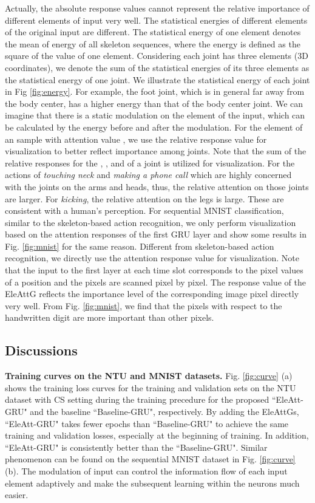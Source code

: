 \documentclass[journal]{IEEEtran}
\newcommand{\EleAttGn}{{EleAttG}}
\begin{document}
Actually, the absolute response values cannot represent the relative importance of different elements of input very well. The statistical energies of different elements of the original input are different. The statistical energy of one element denotes the mean of energy of all skeleton sequences, where the energy is defined as the square of the value of one element. Considering each joint has three elements (3D coordinates), we denote the sum of the statistical energies of its three elements as the statistical energy of one joint. We illustrate the statistical energy of each joint in Fig \ref{fig:energy}. For example, the foot joint, which is in general far away from the body center, has a higher energy than that of the body center joint. We can imagine that there is a static modulation  on the  element of the input, which can be calculated by the energy before and after the modulation. For the  element of an sample  with attention value , we use the relative response value  for visualization to better reflect importance among joints. Note that the sum of the relative responses for the , , and  of a joint is utilized for visualization. For the actions of \emph{touching neck} and \emph{making a phone call}  which are highly concerned with the joints on the arms and heads, thus, the relative attention on those joints are larger. For \emph{kicking}, the relative attention on the legs is large. These are consistent with a human's perception. 
For sequential MNIST classification, similar to the skeleton-based action recognition, we only perform visualization based on the attention responses of the first GRU layer and show some results in Fig. \ref{fig:mnist} for the same reason. Different from skeleton-based action recognition, we directly use the attention response value  for visualization. Note that the input to the first layer at each time slot corresponds to the pixel values of a position and the pixels are scanned pixel by pixel. The response value of the {\EleAttGn} reflects the importance level of the corresponding image pixel directly very well. From Fig. \ref{fig:mnist}, we find that the pixels with respect to the handwritten digit are more important than other pixels. 

\subsection{Discussions}
\textbf{Training curves on the NTU and MNIST datasets.} Fig. \ref{fig:curve} (a) shows the training loss curves for the training and validation sets on the NTU dataset with CS setting during the training precedure for the proposed ``EleAtt-GRU" and the baseline ``Baseline-GRU", respectively. By adding the {\EleAttGn}s, ``EleAtt-GRU" takes fewer epochs than ``Baseline-GRU" to achieve the same training and validation losses, especially at the beginning of training. In addition, ``EleAtt-GRU" is consistently better than the ``Baseline-GRU". Similar phenomenon can be found on the sequential MNIST dataset in Fig. \ref{fig:curve} (b). The modulation of input can control the information flow of each input element adaptively and make the subsequent learning within the neurons much easier. 
\end{document}
